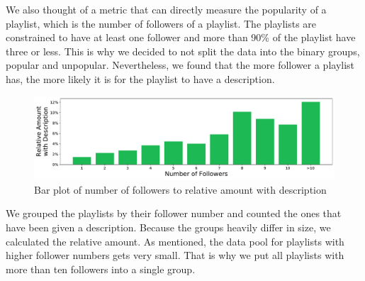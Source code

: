 We also thought of a metric that can directly measure the popularity of a playlist, which is the number of followers of a playlist. The playlists are constrained to have at least one follower and more than 90\% of the playlist have three or less. This is why we decided to not split the data into the binary groups, popular and unpopular. Nevertheless, we found that the more follower a playlist has, the more likely it is for the playlist to have a description.

\begin{figure}[ht]
    \centering
    \includegraphics[width=\textwidth]{fig/followers_to_description.pdf}
    \caption{Bar plot of number of followers to relative amount with description}
    \label{fig:followers_to_description}
\end{figure}

We grouped the playlists by their follower number and counted the ones that have been given a description. Because the groups heavily differ in size, we calculated the relative amount. As mentioned, the data pool for playlists with higher follower numbers gets very small. That is why we put all playlists with more than ten followers into a single group.